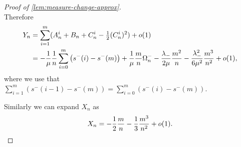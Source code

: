 \begin{proof}[Proof of \cref{lem:measure-change-approx}]
\begin{equation*}
    \end{equation*}
    Therefore
    \begin{align*}
        Y_n
        &= \sum_{i=1}^m (A_n^i + B_n + C_n^i - \tfrac{1}{2} (C_n^i)^2) + o(1) \\
        &= - \frac{1}{\mu} \frac{1}{n} \sum_{i=0}^m \left( s^-(i) - s^-(m) \right)
        + \frac{1}{\mu} \frac{m}{n} \Omega_n^-
        - \frac{\lambda_-}{2\mu} \frac{m^2}{n} - \frac{\lambda_-^2}{6 \mu^2} \frac{m^3}{n^2} + o(1),
    \end{align*}
    where we use that $\sum_{i=1}^m \left( s^-(i-1) - s^-(m) \right) = \sum_{i=0}^m \left( s^-(i) - s^-(m) \right)$.

    Similarly we can expand $X_n$ as
    \begin{equation*}
        X_n = - \frac{1}{2} \frac{m}{n} - \frac{1}{3} \frac{m^3}{n^2} + o(1).
    \end{equation*}


\end{proof}
